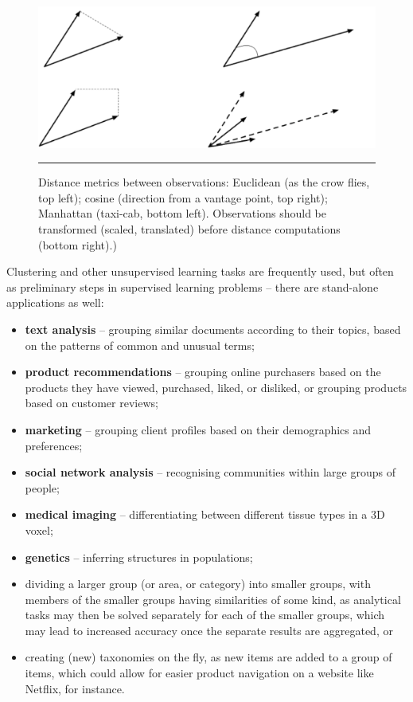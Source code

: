 \begin{figure}[!t]
\centering
\includegraphics[width=\textwidth]{images/DSML/clustering3.png}
\caption[\small Distance metrics between observations.]{\small Distance metrics between observations: Euclidean (as the crow flies, top left); cosine (direction from a vantage point, top right); Manhattan (taxi-cab, bottom left). Observations should be transformed (scaled, translated) before distance computations (bottom right).)}\hrule\label{fig:clust3}
\end{figure}
\afterpage{\FloatBarrier}
\newpage\noindent
Clustering and other unsupervised learning tasks are frequently used, but often as preliminary steps in supervised learning problems -- there are stand-alone applications as well: 
\begin{itemize}[noitemsep]
\item \textbf{text analysis} -- grouping similar documents according to their topics, based on the patterns of common and unusual terms;
\item \textbf{product recommendations} -- grouping online purchasers based on the products they have viewed, purchased, liked, or disliked, or grouping products based on customer reviews;
\item \textbf{marketing} -- grouping client profiles based on their demographics and preferences;
\item \textbf{social network analysis} -- recognising communities within large groups of people;
\item \textbf{medical imaging} -- differentiating between different tissue types in a 3D voxel;
\item \textbf{genetics} -- inferring structures in populations;
\item dividing a larger group (or area, or category) into smaller groups, with members of the smaller groups having similarities of some kind, as analytical tasks may then be solved separately for each of the smaller groups, which may lead to increased accuracy once the separate results are aggregated, or 
\item creating (new) taxonomies on the fly, as new items are added to a group of items, which could allow for easier product navigation on a website like Netflix, for instance.
\end{itemize}
